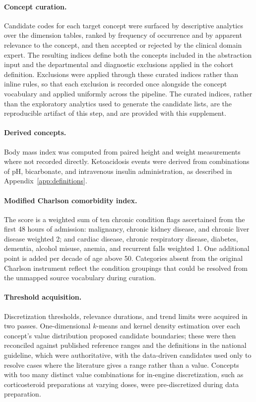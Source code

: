 \documentclass[11pt,a4paper]{article}
\begin{document}
\paragraph{Concept curation.}
Candidate codes for each target concept were surfaced by descriptive
analytics over the dimension tables, ranked by frequency of occurrence and by
apparent relevance to the concept, and then accepted or rejected by the
clinical domain expert. The resulting indices define both the concepts
included in the abstraction input and the departmental and diagnostic
exclusions applied in the cohort definition. Exclusions were applied through
these curated indices rather than inline rules, so that each exclusion is
recorded once alongside the concept vocabulary and applied uniformly across
the pipeline. The curated indices, rather than the exploratory analytics used
to generate the candidate lists, are the reproducible artifact of this step,
and are provided with this supplement.

\paragraph{Derived concepts.}
Body mass index was computed from paired height and weight measurements where
not recorded directly. Ketoacidosis events were derived from combinations of
pH, bicarbonate, and intravenous insulin administration, as described in
Appendix~\ref{app:definitions}.

\paragraph{Modified Charlson comorbidity index.}
The score is a weighted sum of ten chronic condition flags ascertained from
the first 48 hours of admission: malignancy, chronic kidney disease, and
chronic liver disease weighted 2; and cardiac disease, chronic respiratory
disease, diabetes, dementia, alcohol misuse, anemia, and recurrent falls
weighted 1. One additional point is added per decade of age above 50.
Categories absent from the original Charlson instrument reflect the condition
groupings that could be resolved from the unmapped source vocabulary during
curation.

\paragraph{Threshold acquisition.}
Discretization thresholds, relevance durations, and trend limits were
acquired in two passes. One-dimensional $k$-means and kernel density
estimation over each concept's value distribution proposed candidate
boundaries; these were then reconciled against published reference ranges and
the definitions in the national guideline, which were authoritative, with the
data-driven candidates used only to resolve cases where the literature gives
a range rather than a value. Concepts with too many distinct value
combinations for in-engine discretization, such as corticosteroid
preparations at varying doses, were pre-discretized during data preparation.
\end{document}
